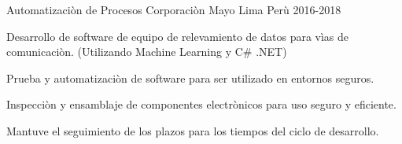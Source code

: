 \begin{cventries}
{\begin{cvitems}
    \end{cvitems}
  }

  \cventry
    {Automatizaci\`{o}n de Procesos} %
    {Corporaci\`{o}n Mayo} %
    {Lima Per\`{u}} %
    {2016-2018} %
    {
      \begin{cvitems} %
        \item {Desarrollo de software de equipo de relevamiento de datos para v\`{i}as de comunicaci\`{o}n. (Utilizando Machine Learning y C# .NET)}
        \item {Prueba y automatizaci\`{o}n de software para ser utilizado en entornos seguros.}
        \item {Inspecci\`{o}n y ensamblaje de componentes electr\`{o}nicos para uso seguro y eficiente.}
        \item {Mantuve el seguimiento de los plazos para los tiempos del ciclo de desarrollo.}

      \end{cvitems}
    }

\end{cventries}
